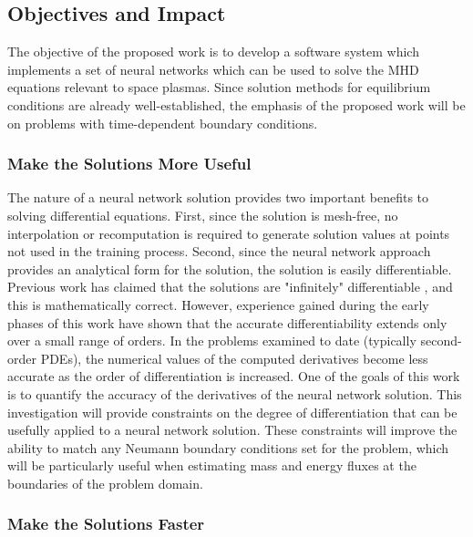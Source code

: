\documentclass{article}
\begin{document}
\subsection{Objectives and Impact}

The objective of the proposed work is to develop a software system which implements a set of neural networks which can be used to solve the MHD equations relevant to space plasmas. Since solution methods for equilibrium conditions are already well-established, the emphasis of the proposed work will be on problems with time-dependent boundary conditions.

\subsubsection{Make the Solutions More Useful}

The nature of a neural network solution provides two important benefits to solving differential equations. First, since the solution is mesh-free, no interpolation or recomputation is required to generate solution values at points not used in the training process. Second, since the neural network approach provides an analytical form for the solution, the solution is easily differentiable. Previous work has claimed that the solutions are "infinitely" differentiable \cite{Lagaris1998}, and this is mathematically correct. However, experience gained during the early phases of this work have shown that the accurate differentiability extends only over a small range of orders. In the problems examined to date (typically second-order PDEs), the numerical values of the computed  derivatives become less accurate as the order of differentiation is increased. One of the goals of this work is to quantify the accuracy of the derivatives of the neural network solution. This investigation will provide constraints on the degree of differentiation that can be usefully applied to a neural network solution. These constraints will improve the ability to match any Neumann boundary conditions set for the problem, which will be particularly useful when estimating mass and energy fluxes at the boundaries of the problem domain.

\subsubsection{Make the Solutions Faster}
\end{document}
